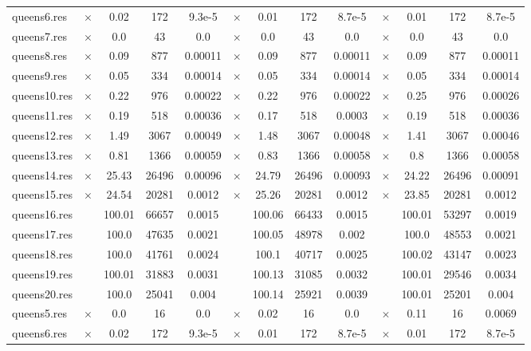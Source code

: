 \documentclass[main.tex]{subfiles}
\begin{document}
\begin{landscape}
\begin{center}
\begin{tabular}{|l|cccc|cccc|cccc|}
queens6.res & $\times$ & 0.02 & 172 & 9.3e-5
 & $\times$ & 0.01 & 172 & 8.7e-5
 & $\times$ & 0.01 & 172 & 8.7e-5
\\
queens7.res & $\times$ & 0.0 & 43 & 0.0
 & $\times$ & 0.0 & 43 & 0.0
 & $\times$ & 0.0 & 43 & 0.0
\\
queens8.res & $\times$ & 0.09 & 877 & 0.00011
 & $\times$ & 0.09 & 877 & 0.00011
 & $\times$ & 0.09 & 877 & 0.00011
\\
queens9.res & $\times$ & 0.05 & 334 & 0.00014
 & $\times$ & 0.05 & 334 & 0.00014
 & $\times$ & 0.05 & 334 & 0.00014
\\
queens10.res & $\times$ & 0.22 & 976 & 0.00022
 & $\times$ & 0.22 & 976 & 0.00022
 & $\times$ & 0.25 & 976 & 0.00026
\\
queens11.res & $\times$ & 0.19 & 518 & 0.00036
 & $\times$ & 0.17 & 518 & 0.0003
 & $\times$ & 0.19 & 518 & 0.00036
\\
queens12.res & $\times$ & 1.49 & 3067 & 0.00049
 & $\times$ & 1.48 & 3067 & 0.00048
 & $\times$ & 1.41 & 3067 & 0.00046
\\
queens13.res & $\times$ & 0.81 & 1366 & 0.00059
 & $\times$ & 0.83 & 1366 & 0.00058
 & $\times$ & 0.8 & 1366 & 0.00058
\\
queens14.res & $\times$ & 25.43 & 26496 & 0.00096
 & $\times$ & 24.79 & 26496 & 0.00093
 & $\times$ & 24.22 & 26496 & 0.00091
\\
queens15.res & $\times$ & 24.54 & 20281 & 0.0012
 & $\times$ & 25.26 & 20281 & 0.0012
 & $\times$ & 23.85 & 20281 & 0.0012
\\
queens16.res &  & 100.01 & 66657 & 0.0015
 &  & 100.06 & 66433 & 0.0015
 &  & 100.01 & 53297 & 0.0019
\\
queens17.res &  & 100.0 & 47635 & 0.0021
 &  & 100.05 & 48978 & 0.002
 &  & 100.0 & 48553 & 0.0021
\\
queens18.res &  & 100.0 & 41761 & 0.0024
 &  & 100.1 & 40717 & 0.0025
 &  & 100.02 & 43147 & 0.0023
\\
queens19.res &  & 100.01 & 31883 & 0.0031
 &  & 100.13 & 31085 & 0.0032
 &  & 100.01 & 29546 & 0.0034
\\
queens20.res &  & 100.0 & 25041 & 0.004
 &  & 100.14 & 25921 & 0.0039
 &  & 100.01 & 25201 & 0.004
\\
queens5.res & $\times$ & 0.0 & 16 & 0.0
 & $\times$ & 0.02 & 16 & 0.0
 & $\times$ & 0.11 & 16 & 0.0069
\\
queens6.res & $\times$ & 0.02 & 172 & 9.3e-5
 & $\times$ & 0.01 & 172 & 8.7e-5
 & $\times$ & 0.01 & 172 & 8.7e-5
\\

\end{tabular}
\end{center}
\end{landscape}
\end{document}
